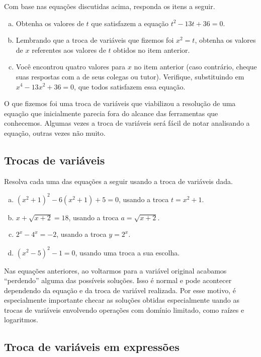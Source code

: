 \documentclass[main_estudante.tex]{subfiles}
\begin{document}
\begin{questao}
Com base nas equações discutidas acima, responda os itens a seguir.
\begin{enumerate}[a)]
\item Obtenha os valores de $t$ que satisfazem a equação $t^2-13t+36=0$.
\item Lembrando que a troca de variáveis que fizemos foi $x^2=t$, obtenha os valores de $x$ referentes aos valores de $t$ obtidos no item anterior.
\item Você encontrou quatro valores para $x$ no item anterior (caso contrário, cheque suas respostas com a de seus colegas ou tutor). Verifique, substituindo em $x^4-13x^2+36=0$, que todos satisfazem essa equação.
\end{enumerate}
\end{questao}

O que fizemos foi uma troca de variáveis que viabilizou a resolução de uma equação que inicialmente parecia fora do alcance das ferramentas que conhecemos. Algumas vezes a troca de variáveis será fácil de notar analisando a equação, outras vezes não muito.

\subsection*{Trocas de variáveis}

\begin{questao}
Resolva cada uma das equações a seguir usando a troca de variáveis dada.
\begin{enumerate}[a)]
\item $(x^2+1)^2-6(x^2+1)+5=0$, usando a troca $t=x^2+1$.
\item $x+\sqrt{x+2}=18$, usando a troca $a=\sqrt{x+2}$.
\item $2^x-4^x=-2$, usando a troca $y=2^x$.
\item $(x^2-5)^2-1=0$, usando uma troca a sua escolha.
\end{enumerate}
\end{questao}

Nas equações anteriores, ao voltarmos para a variável original acabamos ``perdendo'' alguma das possíveis soluções. Isso é normal e pode acontecer dependendo da equação e da troca de variável realizada. Por esse motivo, é especialmente importante checar as soluções obtidas especialmente uando as trocas de variáveis envolvendo operações com domínio limitado, como raízes e logaritmos.

\subsection*{Troca de variáveis em expressões}
\end{document}
